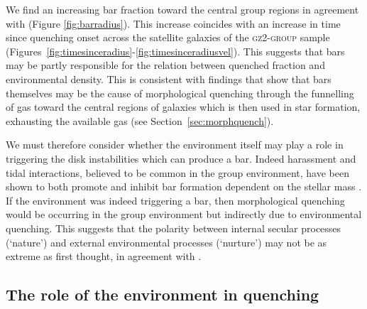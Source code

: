 \documentclass[useAMS,usenatbib]{mn2e}
\begin{document}
We find an increasing bar fraction toward the central group regions in agreement with \cite{skibba12} (Figure \ref{fig:barradius}). This increase coincides with an increase in time since quenching onset across the satellite galaxies of the \textsc{gz2-group} sample (Figures~\ref{fig:timesinceradius}-\ref{fig:timesinceradiusvel}). This suggests that bars may be partly responsible for the relation between quenched fraction and environmental density. This is consistent with findings that show that bars themselves may be the cause of morphological quenching through the funnelling of gas toward the central regions of galaxies \citep{athanassoula92b, sheth05} which is then used in star formation, exhausting the available gas (see Section~\ref{sec:morphquench}).


We must therefore consider whether the environment itself may play a role in triggering the disk instabilities which can produce a bar. Indeed harassment and tidal interactions, believed to be common in the group environment, have been shown to both promote and inhibit bar formation dependent on the stellar mass \citep{noguchi88, moore96, skibba12}.  If the environment was indeed triggering a bar, then morphological quenching would be occurring in the group environment but indirectly due to environmental quenching. This suggests that the polarity between internal secular processes (`nature') and external environmental processes (`nurture') may not be as extreme as first thought, in agreement with \cite{skibba12}. 

\subsection{The role of the environment in quenching}\label{sec:roleenv}
\end{document}
